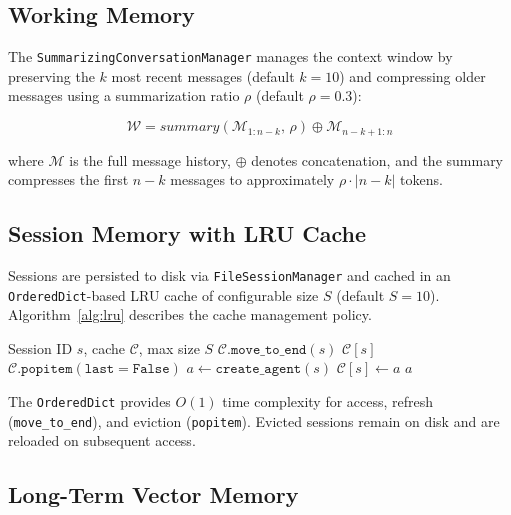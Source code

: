 \documentclass[9pt,twocolumn,letterpaper]{extarticle}
\begin{document}
\subsection{Working Memory}

The \texttt{SummarizingConversationManager} manages the context window by preserving the $k$ most recent messages (default $k{=}10$) and compressing older messages using a summarization ratio $\rho$ (default $\rho{=}0.3$):

\begin{equation}
\mathcal{W} = \textit{summary}(\mathcal{M}_{1:n-k},\, \rho) \oplus \mathcal{M}_{n-k+1:n}
\end{equation}

\noindent where $\mathcal{M}$ is the full message history, $\oplus$ denotes concatenation, and the summary compresses the first $n{-}k$ messages to approximately $\rho \cdot |n{-}k|$ tokens.

\subsection{Session Memory with LRU Cache}

Sessions are persisted to disk via \texttt{FileSessionManager} and cached in an \texttt{OrderedDict}-based LRU cache of configurable size $S$ (default $S{=}10$).
Algorithm~\ref{alg:lru} describes the cache management policy.

\begin{algorithm}[H]
\caption{LRU Session Cache Management}
\label{alg:lru}
\begin{algorithmic}[1]
\REQUIRE Session ID $s$, cache $\mathcal{C}$, max size $S$
  \STATE $\mathcal{C}.\texttt{move\_to\_end}(s)$ 
  \RETURN $\mathcal{C}[s]$
\ENDIF
{}
  \STATE $\mathcal{C}.\texttt{popitem}(\texttt{last}{=}\texttt{False})$ 
\ENDIF
\STATE $a \leftarrow \texttt{create\_agent}(s)$ 
\STATE $\mathcal{C}[s] \leftarrow a$
\RETURN $a$
\end{algorithmic}
\end{algorithm}

The \texttt{OrderedDict} provides $O(1)$ time complexity for access, refresh (\texttt{move\_to\_end}), and eviction (\texttt{popitem}).
Evicted sessions remain on disk and are reloaded on subsequent access.

\subsection{Long-Term Vector Memory}
\end{document}
